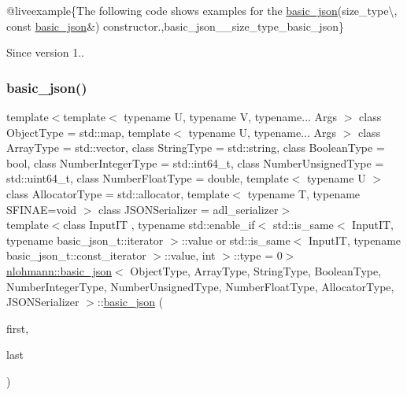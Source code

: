 @liveexample\{The following code shows examples for the \mbox{\hyperlink{classnlohmann_1_1basic__json}{basic\+\_\+json}}(size\+\_\+type\textbackslash{}, const \mbox{\hyperlink{classnlohmann_1_1basic__json}{basic\+\_\+json}}\&) constructor.,basic\+\_\+json\+\_\+\+\_\+size\+\_\+type\+\_\+basic\+\_\+json\}

\begin{DoxySince}{Since}
version 1.. 
\end{DoxySince}
\mbox{\label{classnlohmann_1_1basic__json_abe197e9f3184487805cfb5bba6fd5938}} 
\subsubsection{\texorpdfstring{basic\_json()}{basic\_json()}\hspace{0.1cm}{\footnotesize\ttfamily [6/9]}}
{\footnotesize\ttfamily template$<$template$<$ typename U, typename V, typename... Args $>$ class Object\+Type = std\+::map, template$<$ typename U, typename... Args $>$ class Array\+Type = std\+::vector, class String\+Type  = std\+::string, class Boolean\+Type  = bool, class Number\+Integer\+Type  = std\+::int64\+\_\+t, class Number\+Unsigned\+Type  = std\+::uint64\+\_\+t, class Number\+Float\+Type  = double, template$<$ typename U $>$ class Allocator\+Type = std\+::allocator, template$<$ typename T, typename S\+F\+I\+N\+A\+E=void $>$ class J\+S\+O\+N\+Serializer = adl\+\_\+serializer$>$ \\
template$<$class Input\+IT , typename std\+::enable\+\_\+if$<$ std\+::is\+\_\+same$<$ Input\+I\+T, typename basic\+\_\+json\+\_\+t\+::iterator $>$\+::value or std\+::is\+\_\+same$<$ Input\+I\+T, typename basic\+\_\+json\+\_\+t\+::const\+\_\+iterator $>$\+::value, int $>$\+::type  = 0$>$ \\
\mbox{\hyperlink{classnlohmann_1_1basic__json}{nlohmann\+::basic\+\_\+json}}$<$ Object\+Type, Array\+Type, String\+Type, Boolean\+Type, Number\+Integer\+Type, Number\+Unsigned\+Type, Number\+Float\+Type, Allocator\+Type, J\+S\+O\+N\+Serializer $>$\+::\mbox{\hyperlink{classnlohmann_1_1basic__json}{basic\+\_\+json}} (\begin{DoxyParamCaption}\item[{Input\+IT}]{first,  }\item[{Input\+IT}]{last }\end{DoxyParamCaption})\hspace{0.3cm}{\ttfamily [inline]}}



